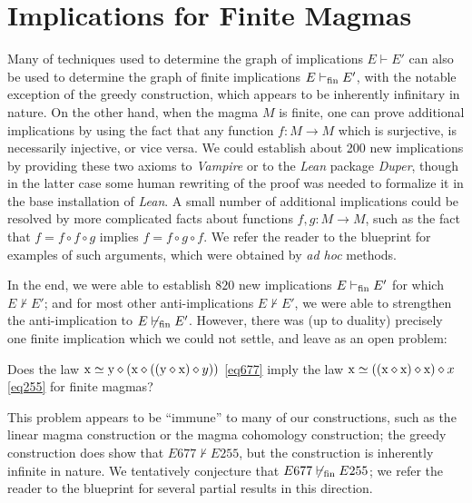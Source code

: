 \section{Implications for Finite Magmas}\label{austin-sec}

Many of techniques used to determine the graph of implications $E \vdash E'$ can also be used to determine the graph of finite implications $E \vdash_{\mathrm{fin}} E'$, with the notable exception of the greedy construction, which appears to be inherently infinitary in nature.  On the other hand, when the magma $M$ is finite, one can prove additional implications by using the fact that any function $f \colon M \to M$ which is surjective, is necessarily injective, or vice versa.  We could establish about 200 new implications by providing these two axioms to \emph{Vampire} or to the \emph{Lean} package \emph{Duper}, though in the latter case some human rewriting of the proof was needed to formalize it in the base installation of \emph{Lean}.  A small number of additional implications could be resolved by more complicated facts about functions $f,g \colon M \to M$, such as the fact that $f = f \circ f \circ g$ implies $f = f \circ g \circ f$.  We refer the reader to the blueprint for examples of such arguments, which were obtained by \emph{ad hoc} methods.

In the end, we were able to establish $820$ new implications $E \vdash_{\mathrm{fin}} E'$ for which $E \not \vdash E'$; and for most other anti-implications $E \not \vdash E'$, we were able to strengthen the anti-implication to $E \not \vdash_{\mathrm{fin}} E'$.  However, there was (up to duality) precisely one finite implication which we could not settle, and leave as an open problem:

\begin{problem}  Does the law $\mathrm{x} \simeq \mathrm{y} \diamond (\mathrm{x} \diamond ((\mathrm{y} \diamond \mathrm{x}) \diamond y))$ \eqref{eq677} imply the law $\mathrm{x} \simeq ((\mathrm{x} \diamond \mathrm{x}) \diamond \mathrm{x}) \diamond x$ \eqref{eq255} for finite magmas?
\end{problem}

This problem appears to be ``immune'' to many of our constructions, such as the linear magma construction or the magma cohomology construction; the greedy construction does show that $E677 \not \vdash E255$, but the construction is inherently infinite in nature.  We tentatively conjecture that $E677 \not \vdash_{\mathrm{fin}} E255$; we refer the reader to the blueprint for several partial results in this direction.
